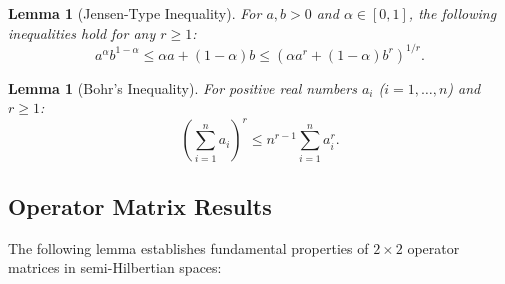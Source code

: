 \documentclass{article}
\newtheorem{lemma}[theorem]{Lemma}
\begin{document}
\begin{lemma}[Jensen-Type Inequality]
\label{lem:jensen}
For $a, b > 0$ and $\alpha \in [0, 1]$, the following inequalities hold for any $r \geq 1$:
\[
a^\alpha b^{1-\alpha} \leq \alpha a + (1-\alpha)b \leq \left(\alpha a^r + (1-\alpha)b^r\right)^{1/r}.
\]
\end{lemma}

\begin{lemma}[Bohr's Inequality]
\label{lem:bohr}
For positive real numbers $a_i$ ($i = 1, \dots, n$) and $r \geq 1$:
\[
\left(\sum_{i=1}^n a_i\right)^r \leq n^{r-1}\sum_{i=1}^n a_i^r.
\]
\end{lemma}

\subsection{Operator Matrix Results}

The following lemma establishes fundamental properties of $2 \times 2$ operator matrices in semi-Hilbertian spaces:
\end{document}
